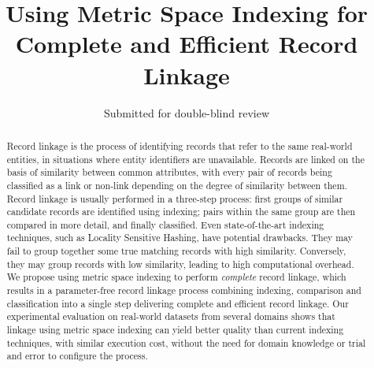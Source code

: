 \documentclass{llncs}
\begin{document}
       
\title{Using Metric Space Indexing for Complete and Efficient Record Linkage}


\author{Submitted for double-blind review}

\maketitle

\begin{abstract}

Record linkage is the process of identifying records that refer to the
same real-world entities, in situations where entity identifiers are
unavailable. Records are linked on the basis of similarity between
common attributes, with every pair of records being classified as a
link or non-link depending on the degree of similarity between them.
Record linkage is usually performed in a three-step process: first
groups of similar candidate records are identified using indexing; 
pairs within the same group are then compared in more detail, and
finally classified.
%
Even state-of-the-art indexing techniques, such as Locality Sensitive
Hashing, have potential drawbacks. They may fail to group together some
true matching records with high similarity. Conversely, they may group
records with low similarity, leading to high computational overhead.
%
We propose using metric space indexing to perform \emph{complete} record
linkage, which results in a parameter-free record linkage process
combining indexing, comparison and classification into a single step
delivering complete and efficient record linkage. Our experimental
evaluation on real-world datasets from several domains shows that
linkage using metric space indexing can yield better quality than
current indexing techniques, with similar execution cost, without the
need for domain knowledge or trial and error to configure the process.

\end{abstract}
\end{document}
